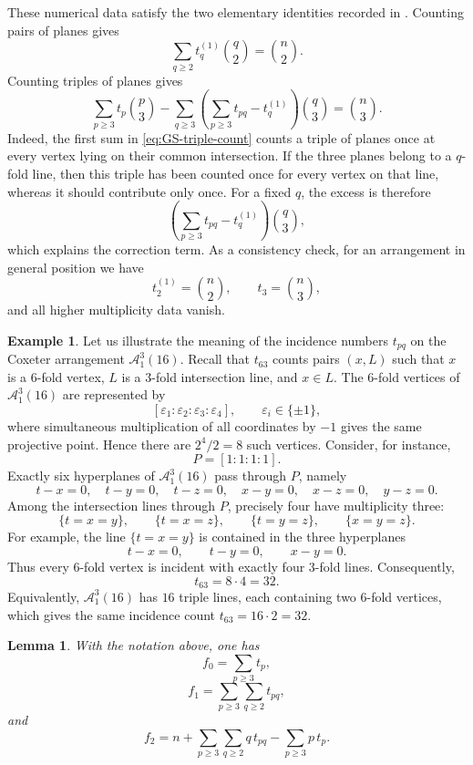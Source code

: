 \documentclass[11pt]{article}
\newtheorem{lemma}[theorem]{Lemma}
\theoremstyle{definition}
\newtheorem{example}[theorem]{Example}
\theoremstyle{remark}
\newcommand{\cA}{\mathcal A}
\begin{document}
These numerical data satisfy the two elementary identities recorded in
\cite[Section 2.1]{Hunt}. Counting pairs of planes gives
\begin{equation}
\label{eq:GS-pair-count}
\sum_{q\geq 2} t_q^{(1)}\binom{q}{2}
=
\binom{n}{2}.
\end{equation}
Counting triples of planes gives
\begin{equation}
\label{eq:GS-triple-count}
\sum_{p\geq 3} t_p\binom{p}{3}
-
\sum_{q\geq 3}
\left(
\sum_{p\geq 3}t_{pq}-t_q^{(1)}
\right)
\binom{q}{3}
=
\binom{n}{3}.
\end{equation}
Indeed, the first sum in \eqref{eq:GS-triple-count} counts a triple of
planes once at every vertex lying on their common intersection. If the
three planes belong to a $q$-fold line, then this triple has been counted
once for every vertex on that line, whereas it should contribute only
once. For a fixed $q$, the excess is therefore
\[
\left(
\sum_{p\geq 3}t_{pq}-t_q^{(1)}
\right)\binom{q}{3},
\]
which explains the correction term. As a consistency check, for an arrangement in general position we have
\[
t_2^{(1)}=\binom{n}{2},\qquad t_3=\binom{n}{3},
\]
and all higher multiplicity data vanish.
\begin{example} Let us illustrate the meaning of the incidence numbers $t_{pq}$ on the Coxeter arrangement $\cA^3_1(16)$. 
Recall that $t_{63}$ counts pairs $(x,L)$ such that $x$ is a $6$-fold vertex, $L$ is a $3$-fold intersection line, and $x\in L$. The $6$-fold vertices of $\cA^3_1(16)$ are represented by 
\[ [\varepsilon_1:\varepsilon_2:\varepsilon_3:\varepsilon_4], \qquad \varepsilon_i\in\{\pm1\}, \] 
where simultaneous multiplication of all coordinates by $-1$ gives the same projective point. 
Hence there are $2^4/2=8$ such vertices. Consider, for instance, \[ P=[1:1:1:1]. \] 
Exactly six hyperplanes of $\cA^3_1(16)$ pass through $P$, namely \[ t-x=0,\quad t-y=0,\quad t-z=0,\quad x-y=0,\quad x-z=0,\quad y-z=0. \] Among the intersection lines through $P$, precisely four have multiplicity three: \[ \{t=x=y\},\qquad \{t=x=z\},\qquad \{t=y=z\},\qquad \{x=y=z\}. \] For example, the line $\{t=x=y\}$ is contained in the three hyperplanes \[ t-x=0,\qquad t-y=0,\qquad x-y=0. \] Thus every $6$-fold vertex is incident with exactly four $3$-fold lines. Consequently, \[ t_{63}=8\cdot4=32. \] Equivalently, $\cA^3_1(16)$ has $16$ triple lines, each containing two $6$-fold vertices, which gives the same incidence count $t_{63}=16\cdot2=32$. \end{example}
\begin{lemma}
\label{lem:face-numbers-incidence}
With the notation above, one has
\[
f_0
=
\sum_{p\geq 3}t_p,
\]
\[
f_1
=
\sum_{p\geq 3}\sum_{q\geq 2}t_{pq},
\]
and
\[
f_2
=
n
+
\sum_{p\geq 3}\sum_{q\geq 2}q\,t_{pq}
-
\sum_{p\geq 3}p\,t_p.
\]
\end{lemma}
\end{document}
